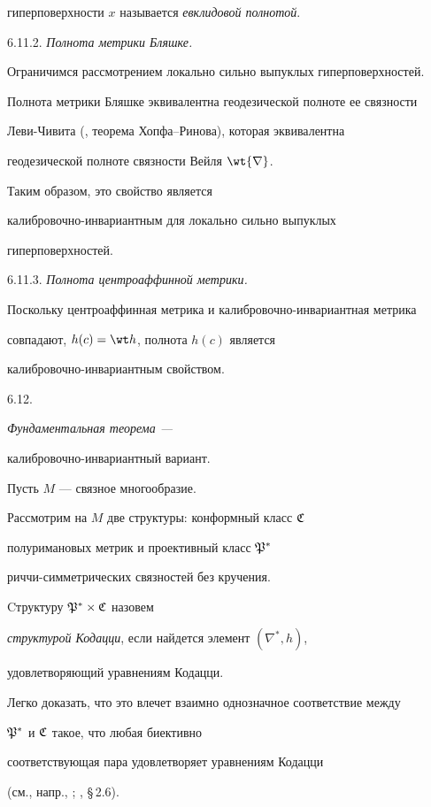гиперповерхности $x$ называется {\it евклидовой полнотой}.

\smallskip



6.11.2. {\it Полнота метрики Бляшке.}

Ограничимся рассмотрением локально сильно выпуклых гиперповерхностей.

Полнота метрики Бляшке эквивалентна геодезической полноте ее связности

Леви-Чивита (\cite{O'N}, теорема Хопфа--Ринова), которая эквивалентна

геодезической полноте связности Вейля $\wt {\nabla}$.

Таким образом, это свойство является

калибровочно-инвариантным для локально сильно выпуклых

гиперповерхностей.

\smallskip



6.11.3. {\it Полнота центроаффинной метрики.}

Поскольку центроаффинная метрика и ка\-либ\-ро\-воч\-но-инвариантная метрика

совпадают, $h(c) = \wt h$, полнота $h(c)$ является

калибровочно-инвариантным свойством.

\medskip



6.12. {\it Фундаментальная теорема ---

калибровочно-инвариантный вариант.} Пусть $M$ --- связное многообразие.

Рассмотрим на $M$ две структуры: конформный класс $\frak C$

полуримановых метрик и проективный класс $\frak P^*$

риччи-симметрических связностей без кручения.

Cтруктуру $\frak P^* \times \frak C$ назовем

{\it структурой Кодацци}, если найдется элемент $(\nabla ^*,h)$,

удовлетворяющий уравнениям Кодацци.

Легко доказать, что это влечет взаимно однозначное соответствие между

$\frak P^*$ и $\frak C$ такое, что любая биективно

соответствующая пара удовлетворяет уравнениям Кодацци

(см., напр., \cite{SIM-4};  \cite{SIM-5}, \S\,2.6).

